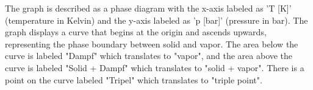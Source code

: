 The graph is described as a phase diagram with the x-axis labeled as 'T [K]' (temperature in Kelvin) and the y-axis labeled as 'p [bar]' (pressure in bar). The graph displays a curve that begins at the origin and ascends upwards, representing the phase boundary between solid and vapor. The area below the curve is labeled "Dampf" which translates to "vapor", and the area above the curve is labeled "Solid + Dampf" which translates to "solid + vapor". There is a point on the curve labeled "Tripel" which translates to "triple point".